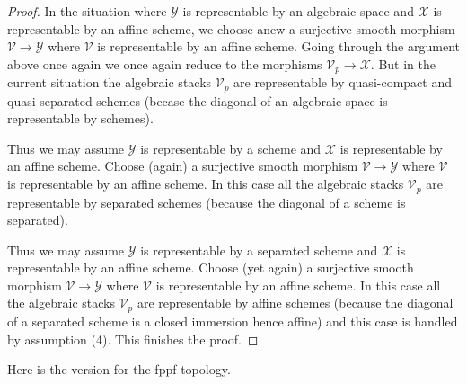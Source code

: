 \begin{proof}
\medskip\noindent
In the situation where $\mathcal{Y}$ is representable by an algebraic
space and $\mathcal{X}$ is representable by an affine scheme, we choose
anew a surjective smooth morphism $\mathcal{V} \to \mathcal{Y}$ where
$\mathcal{V}$ is representable by an affine scheme. Going through the
argument above once again we once again reduce to the morphisms
$\mathcal{V}_p \to \mathcal{X}$. But in the current situation the algebraic
stacks $\mathcal{V}_p$ are representable by quasi-compact and quasi-separated
schemes (becase the diagonal of an algebraic space is representable by
schemes).

\medskip\noindent
Thus we may assume $\mathcal{Y}$ is representable by a scheme and
$\mathcal{X}$ is representable by an affine scheme. Choose (again)
a surjective smooth morphism $\mathcal{V} \to \mathcal{Y}$ where
$\mathcal{V}$ is representable by an affine scheme. In this case all
the algebraic stacks $\mathcal{V}_p$ are representable by separated
schemes (because the diagonal of a scheme is separated).

\medskip\noindent
Thus we may assume $\mathcal{Y}$ is representable by a separated scheme and
$\mathcal{X}$ is representable by an affine scheme. Choose (yet again)
a surjective smooth morphism $\mathcal{V} \to \mathcal{Y}$ where
$\mathcal{V}$ is representable by an affine scheme. In this case all
the algebraic stacks $\mathcal{V}_p$ are representable by affine schemes
(because the diagonal of a separated scheme is a closed immersion hence affine)
and this case is handled by assumption (4).
This finishes the proof.
\end{proof}

\noindent
Here is the version for the fppf topology.

